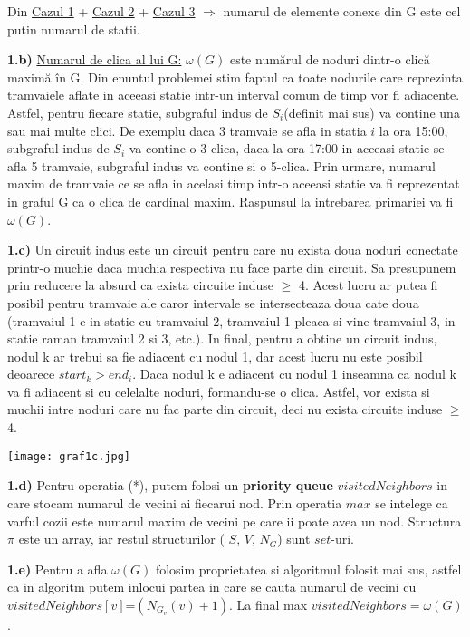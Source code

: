 \documentclass{article}
\begin{document}
\par Din \underline{Cazul 1} + \underline{Cazul 2} +  \underline{Cazul 3} $\Rightarrow$ numarul de elemente conexe din G este cel putin numarul de statii.
\\ \par\textbf{1.b)} \underline{Numarul de clica al lui G:} $\omega(G)$ este numărul de noduri dintr-o clică maximă în G. Din enuntul problemei stim faptul ca toate nodurile care reprezinta tramvaiele aflate in aceeasi statie intr-un interval comun de timp vor fi adiacente. Astfel, pentru fiecare statie, subgraful indus de $S_{i}$(definit mai sus) va contine una sau mai multe clici. De exemplu daca 3 tramvaie se afla in statia $i$ la ora 15:00, subgraful indus de $S_{i}$ va contine o 3-clica, daca la ora 17:00 in aceeasi statie se afla 5 tramvaie, subgraful indus va contine si o 5-clica. Prin urmare, numarul maxim de tramvaie ce se afla in acelasi timp intr-o aceeasi statie va fi reprezentat in graful G ca o clica de cardinal maxim. Raspunsul la intrebarea primariei va fi $\omega(G)$.
\\ \par \textbf{1.c)} Un circuit indus este un circuit pentru care nu exista doua noduri conectate printr-o muchie daca muchia respectiva nu face parte din circuit. Sa presupunem prin reducere la absurd ca exista circuite induse $\geq$ 4. Acest lucru ar putea fi posibil pentru tramvaie ale caror intervale se intersecteaza doua cate doua (tramvaiul 1 e in statie cu tramvaiul 2, tramvaiul 1 pleaca si vine tramvaiul 3, in statie raman tramvaiul 2 si 3, etc.). In final, pentru a obtine un circuit indus, nodul k ar trebui sa fie adiacent cu nodul 1, dar acest lucru nu este posibil deoarece $start_{k}>end_{i}$. Daca nodul k e adiacent cu nodul 1 inseamna ca nodul k va fi adiacent si cu celelalte noduri, formandu-se o clica. Astfel, vor exista si muchii intre noduri care nu fac parte din circuit, deci nu exista circuite induse $\geq$ 4.


\centerline{
\texttt{[image: graf1c.jpg]}
}
\newpage
 \textbf{1.d)} Pentru operatia (*), putem folosi un \textbf{priority queue} $visitedNeighbors$ in care stocam numarul de vecini ai fiecarui nod. Prin operatia $max$ se intelege ca varful cozii este numarul maxim de vecini pe care ii poate avea un nod. Structura $\pi$ este un array, iar restul structurilor ( $S$, $V$, $N_G$) sunt $set$-uri.
  \par \textbf{1.e)} Pentru a afla $\omega(G)$ folosim proprietatea si algoritmul folosit mai sus, astfel ca in algoritm putem inlocui partea in care se cauta numarul de vecini cu $visitedNeighbors[v]$=$(N_{G_v}(v)+1)$. La final max $visitedNeighbors=\omega(G)$.
  
\end{document}
